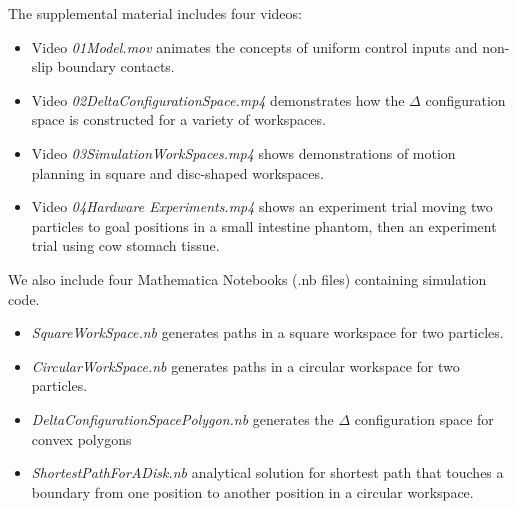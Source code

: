  The supplemental material includes four videos:
  	\begin{itemize}	 
 \item Video  \emph{01Model.mov} animates the concepts of uniform control inputs and non-slip boundary contacts.
 \item Video  \emph{02DeltaConfigurationSpace.mp4} demonstrates how the $\Delta$ configuration space is constructed for a variety of workspaces.
 \item Video  \emph{03SimulationWorkSpaces.mp4} shows demonstrations of motion planning in square and disc-shaped workspaces. 
 \item Video  \emph{04Hardware Experiments.mp4} shows an experiment trial moving two particles to goal positions in a small intestine phantom, then an experiment trial using cow stomach tissue.
		\end{itemize}	 	
We also include four  Mathematica Notebooks (.nb files) containing simulation code.  
		   	\begin{itemize}	 
 \item   \emph{SquareWorkSpace.nb} generates paths in a square workspace for two particles.
 \item  \emph{CircularWorkSpace.nb} generates paths in a circular workspace for two particles.
 \item   \emph{DeltaConfigurationSpacePolygon.nb} generates the $\Delta$ configuration space for convex polygons
  \item   \emph{ShortestPathForADisk.nb} analytical solution for shortest path that touches a boundary from one position to another position in a circular workspace.
		\end{itemize}	 
		   
  




  
